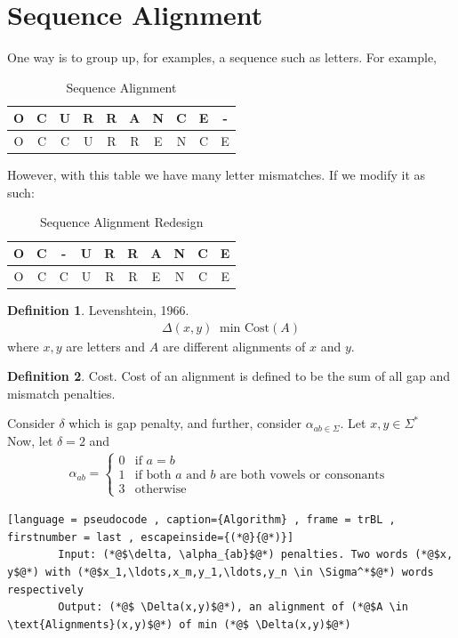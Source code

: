\documentclass[a4paper]{article}
\theoremstyle{plain}
\newcommand*{\MyDef}{\mathrm{def}}
\newcommand*{\eqdef}{\ensuremath{\mathop{\overset{\MyDef}{=}}}}
\theoremstyle{definition}
\newtheorem{defn}{Definition}[section]
\theoremstyle{remark}
\begin{document}
		\section{Sequence Alignment}
		One way is to group up, for examples, a sequence such as letters. For example,
		\begin{table}[H]
			\centering
			\caption{Sequence Alignment}
			\label{tab:label}
			\begin{tabular}{|c|c|c|c|c|c|c|c|c|c|}
				\hline
				O & C & U & R & R & A &N & C & E & -  \\
				\hline
				O & C & C & U & R & R & E & N &C & E\\
			\hline

			\end{tabular}
		\end{table}
		However, with this table we have many letter mismatches. If we modify it as such:
		\begin{table}[H]
			\centering
			\caption{Sequence Alignment Redesign}
			\label{tab:sequenceredesign}
			\begin{tabular}{|c|c|c|c|c|c|c|c|c|c|}
				\hline
				O & C & - & U & R & R & A & N & C & E  \\
				\hline
				O & C & C & U & R & R & E & N &C & E\\
			\hline

			\end{tabular}
		\end{table}
		\begin{defn}
			Levenshtein, 1966. 
			\begin{align*}
				\Delta(x,y) \eqdef \text{min Cost}(A)
			\end{align*}
			where $x,y$ are letters and $A$ are different alignments of $x$ and $y$.
		\end{defn}
		\begin{defn}
			Cost. Cost of an alignment is defined to be the sum of all gap and mismatch penalties. 
		\end{defn}
		Consider $\delta$ which is gap penalty, and further, consider $\alpha_{ab\in \Sigma}$. Let $x,y \in \Sigma^{*}$ \\
		Now, let $\delta = 2$ and
		\begin{align*}
			\alpha_{ab} = \begin{cases}
			0	& \text{if } a=b\\
			1	&\text{if both $a$ and $b$ are both vowels or consonants }\\
			3	& \text{otherwise}
			\end{cases}
		\end{align*}
		\begin{lstlisting}[language = pseudocode , caption={Algorithm} , frame = trBL , firstnumber = last , escapeinside={(*@}{@*)}]
		Input: (*@$\delta, \alpha_{ab}$@*) penalties. Two words (*@$x, y$@*) with (*@$x_1,\ldots,x_m,y_1,\ldots,y_n \in \Sigma^*$@*) words respectively
		Output: (*@$ \Delta(x,y)$@*), an alignment of (*@$A \in \text{Alignments}(x,y)$@*) of min (*@$ \Delta(x,y)$@*)
		\end{lstlisting}
\end{document}
